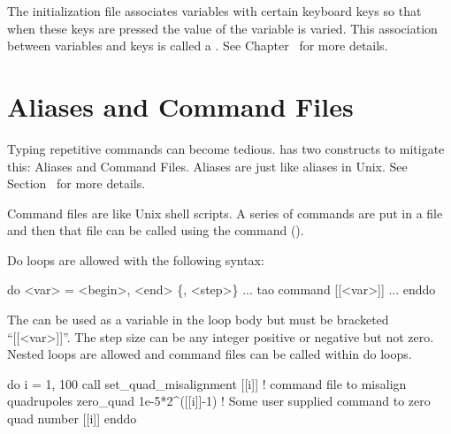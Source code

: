 The  initialization file associates variables with
certain keyboard keys so that when these keys are pressed the value of
the variable is varied. This association between variables and keys is
called a . See Chapter~ for more details.

\section{Aliases and Command Files}
\label{s:command.files}

Typing repetitive commands can become tedious. \tao has two constructs
to mitigate this: Aliases and Command Files. Aliases are just like
aliases in Unix. See Section~ for more details.

Command files are like Unix shell scripts. A series of commands are
put in a file and then that file can be called using the 
command ().

Do loops are allowed with the following syntax:
\begin{example}
  do <var> = <begin>, <end> \{, <step>\} 
    ...
    tao command [[<var>]]
    ...
  enddo
\end{example}
The  can be used as a variable in the loop body but must be
bracketed ``[[<var>]]''.  The step size can be any integer positive or
negative but not zero.  Nested loops are allowed and command files can
be called within do loops.

\begin{example}
  do i = 1, 100
    call set_quad_misalignment [[i]] ! command file to misalign quadrupoles
    zero_quad 1e-5*2^([[i]]-1) ! Some user supplied command to zero quad number [[i]]
  enddo
\end{example}

